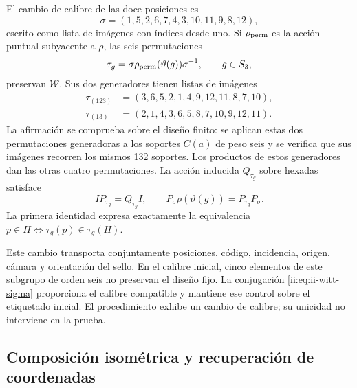 El cambio de calibre de las doce posiciones es
\begin{equation}
 \sigma=(1,5,2,6,7,4,3,10,11,9,8,12),
 \label{ii:eq:ii-witt-sigma}
\end{equation}
escrito como lista de imágenes con índices desde uno. Si
\(\rho_{\rm perm}\) es la acción puntual subyacente a \(\rho\), las
seis permutaciones
\[
 \tau_g=\sigma\rho_{\rm perm}(\vartheta(g))\sigma^{-1},\qquad g\in S_3,
\]
preservan \(\mathcal W\). Sus dos generadores tienen listas de imágenes
\[
\begin{aligned}
 \tau_{(123)}&=(3,6,5,2,1,4,9,12,11,8,7,10),\\
 \tau_{(13)}&=(2,1,4,3,6,5,8,7,10,9,12,11).
\end{aligned}
\]
La afirmación se comprueba sobre el diseño finito: se aplican estas dos
permutaciones generadoras a los soportes
\(C(a)\) de peso seis y se verifica que sus imágenes recorren los
mismos 132 soportes. Los productos de estos generadores dan las otras
cuatro permutaciones. La acción inducida \(Q_{\tau_g}\) sobre hexadas
satisface
\begin{equation}
 I P_{\tau_g}=Q_{\tau_g}I,
 \qquad
 P_\sigma\rho(\vartheta(g))=P_{\tau_g}P_\sigma.
 \label{ii:eq:ii-witt-recalibration}
\end{equation}
La primera identidad expresa exactamente la equivalencia
\(p\in H\Longleftrightarrow\tau_g(p)\in\tau_g(H)\).

Este cambio transporta conjuntamente posiciones, código, incidencia,
origen, cámara y orientación del sello. En el calibre inicial, cinco
elementos de este subgrupo de orden seis no preservan el diseño fijo.
La conjugación \eqref{ii:eq:ii-witt-sigma} proporciona el calibre compatible
y mantiene ese control sobre el etiquetado inicial. El procedimiento
exhibe un cambio de calibre; su unicidad no interviene en la prueba.

\subsection{Composición isométrica y recuperación de coordenadas}

